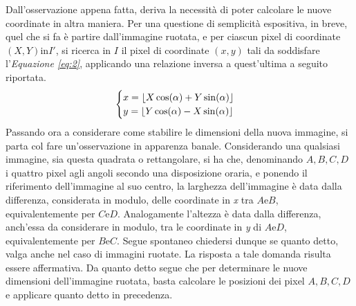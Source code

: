 \documentclass{subfiles}
\begin{document}
Dall'osservazione appena fatta, deriva la necessità di poter calcolare le nuove coordinate in altra maniera.
Per una questione di semplicità espositiva, in breve, quel che si fa è partire dall'immagine ruotata, e per ciascun pixel di coordinate \((X, Y) \text{in} I'\),
si ricerca in \(I\) il pixel di coordinate \((x, y)\) tali da soddisfare l'\emph{Equazione \eqref{eq:2}}, applicando una relazione inversa a quest'ultima a seguito riportata.
\[\begin{cases}
        x = \left\lfloor X \cos(\alpha) + Y \sin(\alpha) \right\rfloor  \\
        y = \left\lfloor Y \cos(\alpha) -  X \sin(\alpha) \right\rfloor \\
    \end{cases}\]
Passando ora a considerare come stabilire le dimensioni della nuova immagine, si parta col fare un'osservazione in apparenza banale.
Considerando una qualsiasi immagine, sia questa quadrata o rettangolare, si ha che, denominando \(A, B, C, D\) i quattro pixel agli angoli secondo una disposizione oraria,
e ponendo il riferimento dell'immagine al suo centro, la larghezza dell'immagine è data dalla differenza, considerata in modulo, delle coordinate in \emph{x} tra \(A \text{e} B\),
equivalentemente per \(C \text{e} D\).
Analogamente l'altezza è data dalla differenza, anch'essa da considerare in modulo, tra le coordinate in \emph{y} di \(A \text{e} D\), equivalentemente per \(B \text{e} C\).
Segue spontaneo chiedersi dunque se quanto detto, valga anche nel caso di immagini ruotate. La risposta a tale domanda risulta essere affermativa.
Da quanto detto segue che per determinare le nuove dimensioni dell'immagine ruotata, basta calcolare le posizioni dei pixel \(A, B, C, D\) e applicare quanto detto in precedenza.

\end{document}
